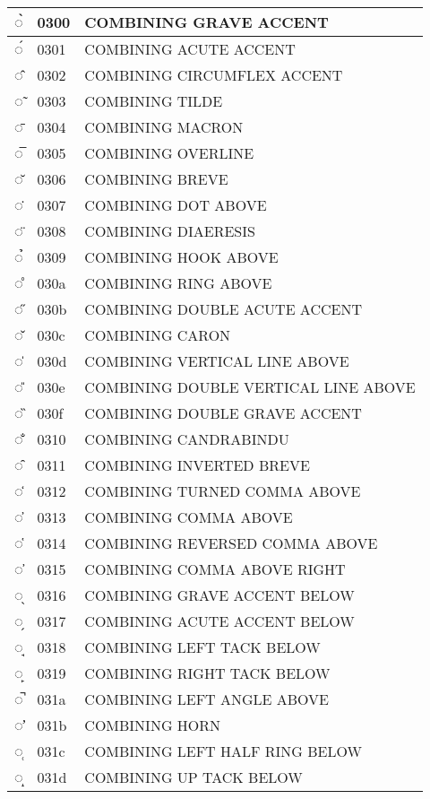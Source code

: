 \documentclass[12pt,letterpaper,openany]{book}
\begin{document}
\begin{center}
\begin{supertabular}{|m{0.25in}|m{0.5in}|m{4in}|}
			◌̀ & 0300 & COMBINING GRAVE ACCENT\\\hline
			◌́ & 0301 & COMBINING ACUTE ACCENT\\\hline
			◌̂ & 0302 & COMBINING CIRCUMFLEX ACCENT\\\hline
			◌̃ & 0303 & COMBINING TILDE\\\hline
			◌̄ & 0304 & COMBINING MACRON\\\hline
			◌̅ & 0305 & COMBINING OVERLINE\\\hline
			◌̆ & 0306 & COMBINING BREVE\\\hline
			◌̇ & 0307 & COMBINING DOT ABOVE\\\hline
			◌̈ & 0308 & COMBINING DIAERESIS\\\hline
			◌̉ & 0309 & COMBINING HOOK ABOVE\\\hline
			◌̊ & 030a & COMBINING RING ABOVE\\\hline
			◌̋ & 030b & COMBINING DOUBLE ACUTE ACCENT\\\hline
			◌̌ & 030c & COMBINING CARON\\\hline
			◌̍ & 030d & COMBINING VERTICAL LINE ABOVE\\\hline
			◌̎ & 030e & COMBINING DOUBLE VERTICAL LINE ABOVE\\\hline
			◌̏ & 030f & COMBINING DOUBLE GRAVE ACCENT\\\hline
			◌̐ & 0310 & COMBINING CANDRABINDU\\\hline
			◌̑ & 0311 & COMBINING INVERTED BREVE\\\hline
			◌̒ & 0312 & COMBINING TURNED COMMA ABOVE\\\hline
			◌̓ & 0313 & COMBINING COMMA ABOVE\\\hline
			◌̔ & 0314 & COMBINING REVERSED COMMA ABOVE\\\hline
			◌̕ & 0315 & COMBINING COMMA ABOVE RIGHT\\\hline
			◌̖ & 0316 & COMBINING GRAVE ACCENT BELOW\\\hline
			◌̗ & 0317 & COMBINING ACUTE ACCENT BELOW\\\hline
			◌̘ & 0318 & COMBINING LEFT TACK BELOW\\\hline
			◌̙ & 0319 & COMBINING RIGHT TACK BELOW\\\hline
			◌̚ & 031a & COMBINING LEFT ANGLE ABOVE\\\hline
			◌̛ & 031b & COMBINING HORN\\\hline
			◌̜ & 031c & COMBINING LEFT HALF RING BELOW\\\hline
			◌̝ & 031d & COMBINING UP TACK BELOW\\\hline

\end{supertabular}
\end{center}
\end{document}
